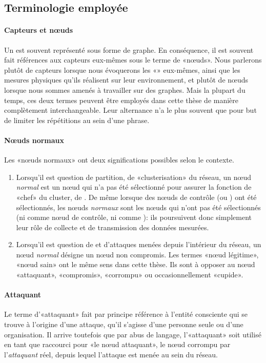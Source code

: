     \subsection{Terminologie employée}
            \paragraph{Capteurs et nœuds}
Un \rcsf est souvent représenté sous forme de graphe.
En conséquence, il est souvent fait références aux capteurs eux-mêmes sous le terme de «nœuds».
Nous parlerons plutôt de capteurs lorsque nous évoquerons les «\rcs» eux-mêmes, ainsi que les mesures physiques qu'ils réalisent sur leur environnement, et plutôt de nœuds lorsque nous sommes amenés à travailler sur des graphes.
Mais la plupart du temps, ces deux termes peuvent être employés dans cette thèse de manière complètement interchangeable.
Leur alternance n'a le plus souvent que pour but de limiter les répétitions au sein d'une phrase.

            \paragraph{Nœuds normaux}
Les «nœuds normaux» ont deux significations possibles selon le contexte.
\begin{enumerate}
    \item Lorsqu'il est question de partition, de «clusterisation» du réseau, un nœud \textit{normal} est un nœud qui n'a pas été sélectionné pour assurer la fonction de «chef» du cluster, de \ch. De même lorsque des nœuds de contrôle (\cns ou \vns) ont été sélectionnés, les nœuds \textit{normaux} sont les nœuds qui n'ont pas été sélectionnés (ni comme nœud de contrôle, ni comme \ch): ils poursuivent donc simplement leur rôle de collecte et de transmission des données mesurées.
    \item Lorsqu'il est question de \secu et d'attaques menées depuis l'intérieur du réseau, un nœud \textit{normal} désigne un nœud non compromis. Les termes «nœud légitime», «nœud sain» ont le même sens dans cette thèse. Ils sont à opposer au nœud «attaquant», «compromis», «corrompu» ou occasionnellement «cupide».
\end{enumerate}

            \paragraph{Attaquant}
Le terme d'«attaquant» fait par principe référence à l'entité consciente qui se trouve à l'origine d'une attaque, qu'il s'agisse d'une personne seule ou d'une organisation.
Il arrive toutefois que par abus de langage, l'«attaquant» soit utilisé en tant que raccourci pour «le nœud attaquant», \cad le nœud corrompu par l'\textit{attaquant} réel, depuis lequel l'attaque est menée au sein du réseau.

